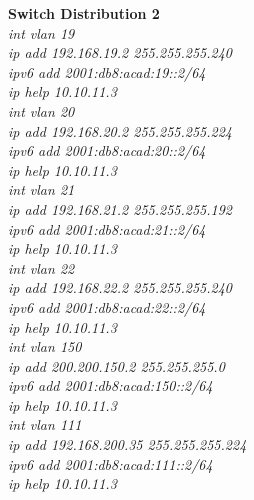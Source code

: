 \documentclass[12pt,a4paper]{report}
\begin{document}
\hspace*{1cm}\textbf{Switch Distribution 2}\\
\hspace*{2cm}\textit{int vlan 19\\
\hspace*{2cm}ip add 192.168.19.2 255.255.255.240\\
\hspace*{2cm}ipv6 add 2001:db8:acad:19::2/64\\
\hspace*{2cm}ip help 10.10.11.3\\
\hspace*{2cm}int vlan 20\\
\hspace*{2cm}ip add 192.168.20.2 255.255.255.224\\
\hspace*{2cm}ipv6 add 2001:db8:acad:20::2/64\\
\hspace*{2cm}ip help 10.10.11.3\\
\hspace*{2cm}int vlan 21\\
\hspace*{2cm}ip add 192.168.21.2 255.255.255.192\\
\hspace*{2cm}ipv6 add 2001:db8:acad:21::2/64\\
\hspace*{2cm}ip help 10.10.11.3\\
\hspace*{2cm}int vlan 22\\
\hspace*{2cm}ip add 192.168.22.2 255.255.255.240\\
\hspace*{2cm}ipv6 add 2001:db8:acad:22::2/64\\
\hspace*{2cm}ip help 10.10.11.3\\
\hspace*{2cm}int vlan 150\\
\hspace*{2cm}ip add 200.200.150.2 255.255.255.0\\
\hspace*{2cm}ipv6 add 2001:db8:acad:150::2/64\\
\hspace*{2cm}ip help 10.10.11.3\\
\hspace*{2cm}int vlan 111\\
\hspace*{2cm}ip add 192.168.200.35 255.255.255.224 \\
\hspace*{2cm}ipv6 add 2001:db8:acad:111::2/64\\
\hspace*{2cm}ip help 10.10.11.3\\}
\end{document}
